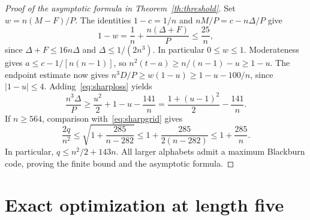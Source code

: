 \documentclass[11pt,a4paper]{article}
\begin{document}
\begin{proof}[Proof of the asymptotic formula in Theorem~\ref{th:threshold}]
Set $w=n(M-F)/P$. The identities $1-c=1/n$ and $nM/P=c-n\Delta/P$ give
\[
 1-w=\frac1n+\frac{n(\Delta+F)}P\le\frac{25}{n},
\]
since $\Delta+F\le16n\Delta$ and $\Delta\le1/(2n^3)$. In particular $0\le w\le1$. Moderateness gives $a\le c-1/[n(n-1)]$, so $n^2(t-a)\ge n/(n-1)-u\ge1-u$. The endpoint estimate now gives $n^3D/P\ge w(1-u)\ge 1-u-100/n$, since $|1-u|\le4$. Adding~\eqref{eq:sharploss} yields
\[
 \frac{n^3\Delta}{P}\ge\frac{u^2}{2}+1-u-\frac{141}{n}
 =\frac{1+(u-1)^2}{2}-\frac{141}{n}.
\]
If $n\ge564$, comparison with~\eqref{eq:sharpgrid} gives
\[
 \frac{2q}{n^2}\le\sqrt{1+\frac{285}{n-282}}
             \le 1+\frac{285}{2(n-282)}\le 1+\frac{285}{n}.
\]
In particular, $q\le n^2/2+143n$. All larger alphabets admit a maximum Blackburn code, proving the finite bound and the asymptotic formula.
\end{proof}

\section{Exact optimization at length five}
\end{document}
